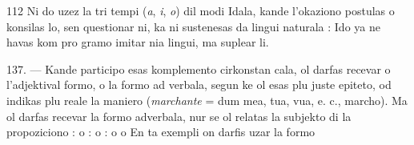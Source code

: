 \begin{VUpage}[116]{112}
Ni do uzez la tri tempi (\textit{a}, \textit{i}, \textit{o}) dil modi Idala, kande\nl
l'okaziono postulas o konsilas lo, sen questionar ni, ka ni\nl
sustenesas da lingui naturala : Ido ya ne havas kom pro\cc
gramo imitar nia lingui, ma suplear li.

\VUblanc{8.67pt}%
137. --- Kande participo esas komplemento cirkonstan\cc
cala, ol darfas recevar o l'adjektival formo, o la formo ad\cc
verbala, segun ke ol esas plu juste epiteto, od indikas plu\nl
reale la maniero (\textit{marchante} = dum mea, tua, vua, e. c.,\nl
marcho). Ma ol darfas recevar la formo adverbala, nur se\nl
ol relatas la subjekto di la propoziciono : \cc
{} o :  o : \nl
{} o  o \nl
{} En ta exempli on darfis uzar la formo\parplein
\end{VUpage}

